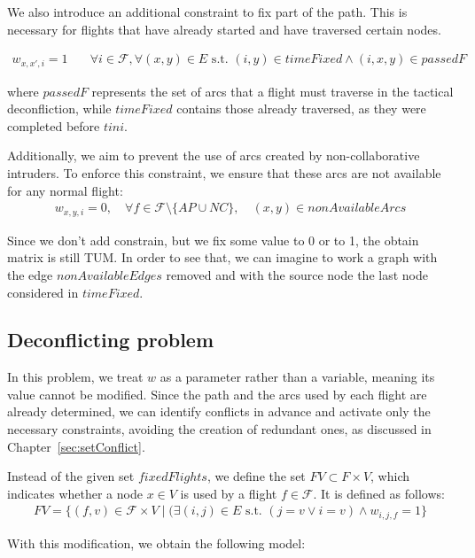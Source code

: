 \documentclass[../thesis.tex]{subfiles}
\begin{document}
We also introduce an additional constraint to fix part of the path.  
This is necessary for flights that have already started and have traversed certain nodes.

\begin{align}
    w_{x,x',i} = 1 & \quad \forall i \in \mathcal{F}, \forall (x,y) \in E \text{ s.t. } (i,y) \in timeFixed \land (i,x,y) \in passedF
\end{align}

where $passedF$ represents the set of arcs that a flight must traverse in the tactical deconfliction, while $timeFixed$ contains those already traversed, as they were completed before $tini$.

Additionally, we aim to prevent the use of arcs created by non-collaborative intruders.  
To enforce this constraint, we ensure that these arcs are not available for any normal flight:  
\begin{align}
    w_{x,y,i} = 0, \quad \forall f \in \mathcal F \setminus \{AP \cup NC\}, \quad (x,y) \in nonAvailableArcs
\end{align}

Since we don't add constrain, but we fix some value to 0 or to 1, the obtain matrix is still TUM.
In order to see that, we can imagine to work a graph with the edge $nonAvailableEdges$ removed and with the source node the last node considered in $timeFixed$.


\subsection{Deconflicting problem}\label{ssec:deconflictingHeur}
In this problem, we treat $w$ as a parameter rather than a variable, meaning its value cannot be modified.
Since the path and the arcs used by each flight are already determined, we can identify conflicts in advance and activate only the necessary constraints, avoiding the creation of redundant ones, as discussed in Chapter~\ref{sec:setConflict}.

Instead of the given set $fixedFlights$, we define the set $FV \subset F \times V$, which indicates whether a node $x \in V$ is used by a flight $f \in\mathcal  F$. It is defined as follows:
\begin{align}\label{eq:set:FV}
    FV = \{(f,v) \in\mathcal F \times V \mid (\exists (i,j) \in E \text{ s.t. } (j = v \lor i = v) \land w_{i,j,f} = 1\}
\end{align}

With this modification, we obtain the following model:
\end{document}
